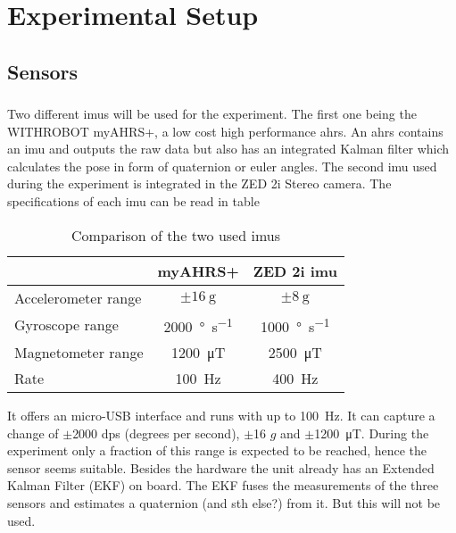 \chapter{Experimental Setup}
\label{ch:ExperimentalSetup}

\section{Sensors}
\subsection{}
Two different \gls{imu}s will be used for the experiment.
The first one being the WITHROBOT myAHRS+, a low cost high performance \gls{ahrs}.
An \gls{ahrs} contains an \gls{imu} and outputs the raw data but also has an integrated Kalman filter which calculates the pose in form of quaternion or euler angles.
The second \gls{imu} used during the experiment is integrated in the ZED 2i Stereo camera.
The specifications of each \gls{imu} can be read in table 
\begin{table}[ht]
	\centering
	\caption{Comparison of the two used \gls{imu}s}
	\label{tab:imu_datasheets}
	\begin{tabular}[t]{lcc}
		\toprule
		&\textbf{myAHRS+} & \textbf{ZED 2i \gls{imu}}\\
		\midrule
		Accelerometer range			& $\pm\SI{16}{\g}$				& $\pm\SI{8}{\g}$\\
		Gyroscope range				& \SI{2000}{\degree\per\second}	& \SI{1000}{\degree\per\second}\\
		Magnetometer range			& \SI{1200}{\micro\tesla}		& \SI{2500}{\micro\tesla}\\
		Rate 						& \SI{100}{\hertz}				& \SI{400}{\hertz}\\
		\bottomrule
	\end{tabular}
\end{table}%
It offers an micro-USB interface and runs with up to \SI{100}{\Hz}.
It can capture a change of $\pm$2000 dps (degrees per second), $\pm$16 $g$ and $\pm$\SI{1200}{\micro\tesla}.
During the experiment only a fraction of this range is expected to be reached, hence the sensor seems suitable.
Besides the hardware the unit already has an Extended Kalman Filter (EKF) on board.
The EKF fuses the measurements of the three sensors and estimates a quaternion (and sth else?) from it.
But this will not be used.



